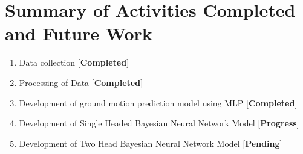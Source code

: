 \documentclass[a4paper,10pt]{article}
\begin{document}
\section{Summary of Activities Completed and Future Work}

\begin{enumerate}
	\item Data collection [\textbf{Completed}]
	\item Processing of Data [\textbf{Completed}]
	\item Development of ground motion prediction model using MLP [\textbf{Completed}]
	\item Development of Single Headed Bayesian Neural Network Model [\textbf{Progress}]
	\item Development of Two Head Bayesian Neural Network Model [\textbf{Pending}]
\end{enumerate}
\end{document}
